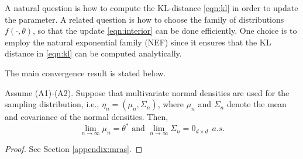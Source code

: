  A natural question is how to compute the KL-distance \eqref{eqn:kl} in order to update the parameter. A related question is how to choose the family of distributions $f(\cdot,\theta)$, so that the update \eqref{eqn:interior} can be done efficiently. One choice is to employ the natural exponential family (NEF) since it ensures that the KL distance in \eqref{eqn:kl} can be computed analytically. %


% 
% 
% 

                    

The main convergence result is stated below.
\begin{theorem}\label{thm:mras}
Assume (A1)-(A2). Suppose that multivariate normal densities are used for the sampling distribution, i.e., $\eta_n = (\mu_n, \Sigma_n)$, where $\mu_n$ and $\Sigma_n$ denote the mean and covariance of the normal densities.
Then, 
\begin{equation}\label{eqn:smain}
\lim_{n\rightarrow \infty}\mu_n=\theta^* \text{ and } \lim_{n\rightarrow \infty}\Sigma_n=0_{d\times d}~~a.s.
\end{equation}
\end{theorem}
\begin{proof}
 See Section \ref{appendix:mras}.
\end{proof}
